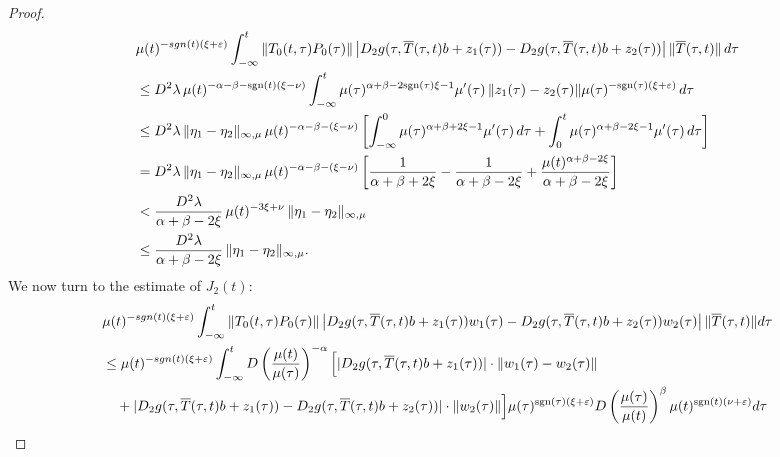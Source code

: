 \documentclass[10pt,a4paper]{amsart}
\begin{document}
\begin{proof}
\begin{align*}
&\mu(t)^{-\textnormal{sgn}(t)(\xi+\varepsilon)} 
\int_{-\infty}^{t} 
  \|T_0(t,\tau) P_0(\tau)\| 
  \left| D_2g(\tau, \overline{T}(\tau,t)b + z_1(\tau)) 
       - D_2g(\tau, \overline{T}(\tau,t)b + z_2(\tau)) \right| 
  \|\overline{T}(\tau,t)\| \, d\tau \\
%
&\leq D^2 \lambda \, \mu(t)^{-\alpha - \beta - \text{sgn}(t)(\xi - \nu)} 
     \int_{-\infty}^{t} 
     \mu(\tau)^{\alpha + \beta - 2\text{sgn}(\tau)\xi - 1} \mu'(\tau) \,
     \|z_1(\tau) - z_2(\tau)\| 
     \mu(\tau)^{-\text{sgn}(\tau)(\xi+\varepsilon)} \, d\tau \\
%
&\leq D^2 \lambda \, \|\eta_1 - \eta_2\|_{\infty,\mu} 
     \, \mu(t)^{-\alpha - \beta - (\xi - \nu)} 
     \left[
       \int_{-\infty}^{0} \mu(\tau)^{\alpha + \beta + 2\xi - 1} \mu'(\tau) \, d\tau
       + \int_{0}^{t} \mu(\tau)^{\alpha + \beta - 2\xi - 1} \mu'(\tau) \, d\tau
     \right] \\
%
&= D^2 \lambda \, \|\eta_1 - \eta_2\|_{\infty,\mu} 
     \, \mu(t)^{-\alpha - \beta - (\xi - \nu)} 
     \left[
       \frac{1}{\alpha + \beta + 2\xi} 
       - \frac{1}{\alpha + \beta - 2\xi} 
       + \frac{\mu(t)^{\alpha + \beta - 2\xi}}{\alpha + \beta - 2\xi}
     \right] \\
%
&< \frac{D^2 \lambda}{\alpha + \beta - 2\xi} 
    \, \mu(t)^{-3\xi + \nu} \, \|\eta_1 - \eta_2\|_{\infty,\mu} \\
%
&\leq \frac{D^2 \lambda}{\alpha + \beta - 2\xi} \, \|\eta_1 - \eta_2\|_{\infty,\mu}.
\end{align*}
We now turn to the estimate of \(J_2(t)\):
\small{\begin{align*}
&\mu(t)^{-\textnormal{sgn}(t)(\xi+\varepsilon)} 
\int_{-\infty}^{t} 
  \|T_0(t,\tau)P_0(\tau)\| 
  \left| 
    D_2g(\tau, \overline{T}(\tau,t)b + z_1(\tau)) w_1(\tau) 
    - D_2g(\tau, \overline{T}(\tau,t)b + z_2(\tau)) w_2(\tau) 
  \right| 
  \|\overline{T}(\tau,t)\| d\tau \\
%
&\leq \mu(t)^{-\textnormal{sgn}(t)(\xi+\varepsilon)} 
\int_{-\infty}^{t} 
  D \left( \frac{\mu(t)}{\mu(\tau)} \right)^{-\alpha} 
  \Big[ 
    |D_2g(\tau, \overline{T}(\tau,t)b + z_1(\tau))| \cdot \|w_1(\tau) - w_2(\tau)\| \\
&\quad + 
    |D_2g(\tau, \overline{T}(\tau,t)b + z_1(\tau)) 
    - D_2g(\tau, \overline{T}(\tau,t)b + z_2(\tau))| \cdot \|w_2(\tau)\| 
  \Big] 
  \mu(\tau)^{\text{sgn}(\tau)(\xi+\varepsilon)} 
  D \left( \frac{\mu(\tau)}{\mu(t)} \right)^{\beta} 
  \mu(t)^{\text{sgn}(t)(\nu+\varepsilon)} d\tau \\

\end{align*}}
\end{proof}
\end{document}
